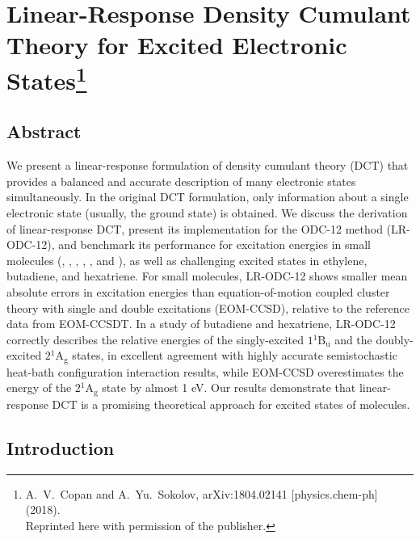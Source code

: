 \chapter[%
    Linear-Response Density Cumulant Theory for Excited Electronic States
]{%
    Linear-Response Density Cumulant Theory for Excited Electronic
    States\footnote{%
        A.~V.~Copan and A.~Yu.~Sokolov,
        arXiv:1804.02141 [physics.chem-ph]
        (2018).\\
        Reprinted here with permission of the publisher.
    }
}
\label{ch:response}

\newpage
\section{Abstract}

We present a linear-response formulation of density cumulant theory (DCT) that
provides a balanced and accurate description of many electronic states
simultaneously.
In the original DCT formulation, only information about a single electronic
state (usually, the ground state) is obtained.
We discuss the derivation of linear-response DCT, present its implementation for
the ODC-12 method (LR-ODC-12), and benchmark its performance for excitation
energies in small molecules (, , , , ,
and ), as well as challenging excited states in ethylene, butadiene,
and hexatriene. 
For small molecules, LR-ODC-12 shows smaller mean absolute errors in excitation energies than equation-of-motion coupled cluster
theory with single and double excitations (EOM-CCSD), relative to the reference
data from EOM-CCSDT\@.
In a study of butadiene and hexatriene, LR-ODC-12 correctly describes the
relative energies of the singly-excited $1{}^1\mathrm{B_{u}}$ and the
doubly-excited $2{}^1\mathrm{A_{g}}$ states, in excellent agreement with
highly accurate semistochastic heat-bath configuration interaction results,
while EOM-CCSD overestimates the energy of the $2{}^1\mathrm{A_{g}}$ state by
almost 1 eV.
Our results demonstrate that linear-response DCT is a promising theoretical approach for excited states of molecules. 


\section{Introduction}

